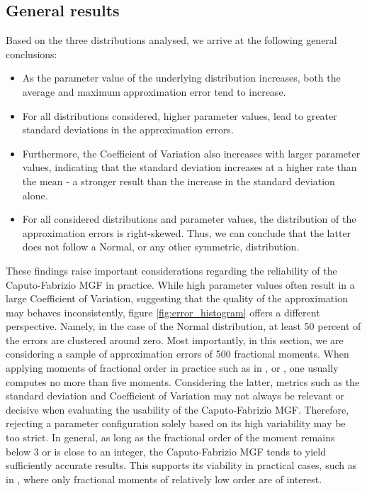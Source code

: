 \subsection{General results}
Based on the three distributions analysed, we arrive at the following  general conclusions:
\begin{itemize}
    \item As the parameter value of the underlying distribution increases, both the average and maximum approximation error tend to increase.
    \item For all distributions considered, higher parameter values, lead to greater standard deviations in the approximation errors.
    \item Furthermore, the Coefficient of Variation also increases with larger parameter values, indicating that the standard deviation increases at a higher rate than the mean - a stronger result than the increase in the standard deviation alone.
    \item For all considered distributions and parameter values, the distribution of the approximation errors is right-skewed. Thus, we can conclude that the latter does not follow a Normal, or any other symmetric, distribution.
\end{itemize}
These findings raise important considerations regarding the reliability of the Caputo-Fabrizio MGF in practice. While high parameter values often result in a large Coefficient of Variation, suggesting that the quality of the approximation may behaves inconsistently, figure \ref{fig:error_histogram} offers a different perspective. Namely, in the case of the Normal distribution, at least 50 percent of the errors are clustered around zero. Most importantly, in this section, we are considering a sample of approximation errors of 500 fractional moments. When applying moments of fractional order in practice such as in \cite{hansen2024}, \cite{Mikosc2013} or \cite{gyzl2013}, one usually computes no more than five moments. Considering the latter, metrics such as the standard deviation and Coefficient of Variation may not always be relevant or decisive when evaluating the usability of the Caputo-Fabrizio MGF. Therefore, rejecting a parameter configuration solely based on its high variability may be too strict. In general, as long as the fractional order of the moment remains below 3 or is close to an integer, the Caputo-Fabrizio MGF tends to yield sufficiently accurate results. This supports its viability in practical cases, such as in \cite{hansen2024}, where only fractional moments of relatively low order are of interest.